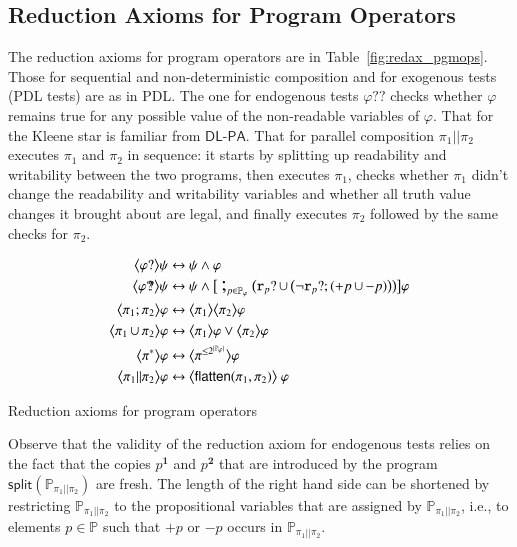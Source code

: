 \documentclass{llncs}
\newcommand{\progsplit}{\mathsf{split}}
\newcommand{\progFlatten}{\mathsf{flatten}}
\newcommand{\atm}{x}
\newcommand{\cp}[2]{{#2}^\mathbf{#1}}
\newcommand{\pll}{ {||} }							%
\newcommand{\readable}[1]{\mathtt{r}_{#1}}
\newcommand{\testendo}{?\!\!?}			%
\newcommand{\testpdl}{?}				%
\newcommand{\Dlpa}{\ensuremath{\mathsf{DL\text{-}PA}}\xspace}
\newcommand{\assgntopV}[1]{{\mathtt {+} #1}}
\newcommand{\assgnbotV}[1]{{\mathtt {-} #1}}
\newcommand{\card}[1]{|#1|}
\newcommand{\lbox}[1]{ \big[ #1 \big] }
\newcommand{\ldia}[1]{ \big\langle #1 \big\rangle}
\newcommand{\leqv}{ \leftrightarrow }
\newcommand{\ndet}{\,{\cup}\,}
\renewcommand{\phi}{\varphi}
\newcommand{\propset}{\mathbb P}
\newcommand{\propsetOf}[1]{\propset_{#1}}
\newcommand{\seqseq}[1]{ \text{\Large ;}_{#1} ~ }
\begin{document}
\subsection{Reduction Axioms for Program Operators}\label{sec:redax_pgmop} 

The reduction axioms for program operators are in Table~\ref{fig:redax_pgmops}.
Those for sequential and non-deterministic composition and for exogenous tests (PDL tests) are as in PDL. 
The one for endogenous tests $ \phi \testendo$ 
checks whether $\phi$ remains true for any possible value of the non-readable variables of $\phi$. 
That for the Kleene star is familiar from \Dlpa. 
That for parallel composition $\pi_1 \pll \pi_2$ executes $\pi_1$ and $\pi_2$ in sequence:
it starts by splitting up readability and writability between the two programs,
then executes $\pi_1$, checks whether $\pi_1$ didn't change the readability and writability variables
and whether all truth value changes it brought about are legal, 
and finally executes $\pi_2$ followed by the same checks for $\pi_2$.

\begin{table}[t]
\begin{align*}
\ldia{\phi \testpdl } \psi \leqv &\ \psi \land \phi
\\
\ldia{\phi \testendo } \psi \leqv &\ \psi \land \lbox{ ~ \seqseq{p \in \propsetOf \phi} \big(
\readable{p} \testpdl \ndet \big( \lnot \readable{p} \testpdl ; (\assgntopV{p} \ndet \assgnbotV{p}) \big) 
\big) } \phi
\\
\ldia{\pi_1 ; \pi_2}  \phi \leqv &\ \ldia{\pi_1 } \ldia{\pi_2}  \phi 
\\
\ldia{\pi_1 \ndet \pi_2}  \phi \leqv &\ \ldia{\pi_1 } \phi \lor \ldia{\pi_2}  \phi 
\\
\ldia{\pi^\ast}  \phi \leqv &\ \ldia{\pi^{\leq 2^{\card{\propsetOf{\phi}}}} }  \phi   
\\
\ldia{\pi_1 \pll \pi_2}  \phi \leqv &\ \ldia{ \progFlatten(\pi_1, \pi_2) } ~ \phi 
\end{align*}
\caption{Reduction axioms for program operators
\label{fig:redax_pgmops}
}
\end{table}

Observe that the validity of the reduction axiom for endogenous tests relies on the fact that the copies  
$\cp 1 p$ and $\cp 2 p$ that are introduced by the program 
$\progsplit( \propsetOf{\pi_1 \pll \pi_2} ) $ are fresh. 
%
%
The length of the right hand side can be shortened by restricting 
$\propsetOf{\pi_1 \pll \pi_2}$ to the propositional variables that are assigned by $\propsetOf{\pi_1 \pll \pi_2}$, i.e., 
to elements $p \in \propset$ such that $\assgntopV p$ or $\assgnbotV p$ occurs in $\propsetOf{\pi_1 \pll \pi_2}$.
\end{document}

